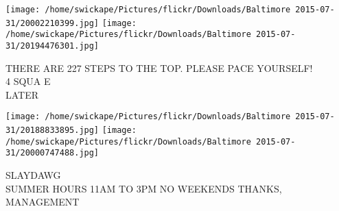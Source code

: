 \documentclass[10pt,letterpaper]{article}
\begin{document}
\vspace{0.25in}
\texttt{[image: /home/swickape/Pictures/flickr/Downloads/Baltimore 2015-07-31/20002210399.jpg]}
\texttt{[image: /home/swickape/Pictures/flickr/Downloads/Baltimore 2015-07-31/20194476301.jpg]}

THERE ARE 227 STEPS TO THE TOP.  PLEASE PACE YOURSELF!\\
4 SQUA E\\
LATER\\
\pagebreak

\texttt{[image: /home/swickape/Pictures/flickr/Downloads/Baltimore 2015-07-31/20188833895.jpg]}
\texttt{[image: /home/swickape/Pictures/flickr/Downloads/Baltimore 2015-07-31/20000747488.jpg]}

SLAYDAWG\\
SUMMER HOURS 11AM TO 3PM NO WEEKENDS THANKS, MANAGEMENT\\
\pagebreak
\end{document}
